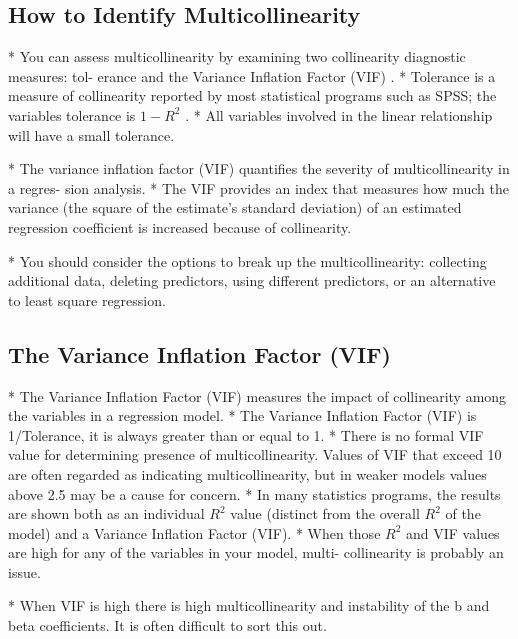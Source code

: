 \subsection{How to Identify Multicollinearity}
\begin{itemize}
*  You can assess multicollinearity by examining two collinearity diagnostic measures: tol-
erance and the Variance Inflation Factor (VIF) .
*  Tolerance is a measure of collinearity reported by most statistical programs such as SPSS;
the variables tolerance is $1 - R^2$ .
*  All variables involved in the linear relationship will have a small tolerance.

*  The variance inflation factor (VIF) quantifies the severity of multicollinearity in a regres-
sion analysis.
*  The VIF provides an index that measures how much the variance (the square of the
estimate’s standard deviation) of an estimated regression coefficient is increased because
of collinearity.


*   You should consider the options to break up the multicollinearity: collecting additional data, deleting predictors, using different predictors, or an alternative to least square regression.

\end{itemize}
\subsection*{The Variance Inflation Factor (VIF)}
\begin{itemize}
*  The Variance Inflation Factor (VIF) measures the impact of collinearity among the variables in a regression model.
*  The Variance Inflation Factor (VIF) is 1/Tolerance, it is always greater than or equal to
1.
*  There is no formal VIF value for determining presence of multicollinearity. Values of VIF
that exceed 10 are often regarded as indicating multicollinearity, but in weaker models
values above 2.5 may be a cause for concern.
*  In many statistics programs, the results are shown both as an individual $R^2$ value (distinct
from the overall $R^2$ of the model) and a Variance Inflation Factor (VIF).
*  When those $R^2$ and VIF values are high for any of the variables in your model, multi-
collinearity is probably an issue.

*  When VIF is high there is high multicollinearity and instability of the b and beta coefficients. It is often difficult to sort this out. 




\end{itemize}


